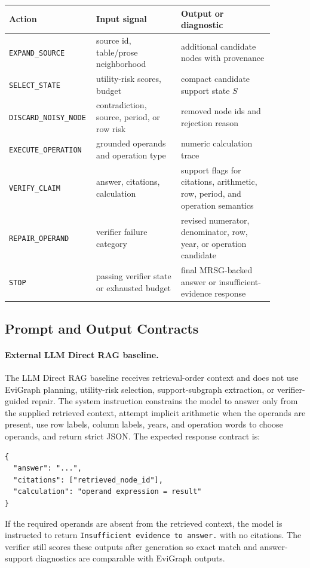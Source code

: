 \begin{center}
\small
\begin{tabular}{p{0.23\linewidth}p{0.31\linewidth}p{0.34\linewidth}}
\hline
Action & Input signal & Output or diagnostic \\
\hline
\texttt{EXPAND\_SOURCE} & source id, table/prose neighborhood & additional
candidate nodes with provenance \\
\texttt{SELECT\_STATE} & utility-risk scores, budget & compact candidate
support state \(S\) \\
\texttt{DISCARD\_NOISY\_NODE} & contradiction, source, period, or row risk &
removed node ids and rejection reason \\
\texttt{EXECUTE\_OPERATION} & grounded operands and operation type & numeric
calculation trace \\
\texttt{VERIFY\_CLAIM} & answer, citations, calculation & support flags for
citations, arithmetic, row, period, and operation semantics \\
\texttt{REPAIR\_OPERAND} & verifier failure category & revised numerator,
denominator, row, year, or operation candidate \\
\texttt{STOP} & passing verifier state or exhausted budget & final MRSG-backed
answer or insufficient-evidence response \\
\hline
\end{tabular}
\end{center}

\subsection{Prompt and Output Contracts}

\paragraph{External LLM Direct RAG baseline.}
The LLM Direct RAG baseline receives retrieval-order context and does not use
EviGraph planning, utility-risk selection, support-subgraph extraction, or
verifier-guided repair.  The system instruction constrains the model to answer
only from the supplied retrieved context, attempt implicit arithmetic when the
operands are present, use row labels, column labels, years, and operation words
to choose operands, and return strict JSON.
The expected response contract is:
\begin{verbatim}
{
  "answer": "...",
  "citations": ["retrieved_node_id"],
  "calculation": "operand expression = result"
}
\end{verbatim}
If the required operands are absent from the retrieved context, the model is
instructed to return \texttt{Insufficient evidence to answer.} with no
citations.  The verifier still scores these outputs after generation so exact
match and answer-support diagnostics are comparable with EviGraph outputs.


